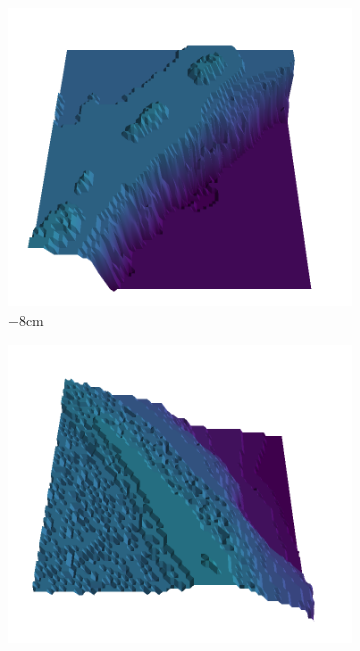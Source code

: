 \documentclass[../document.tex]{subfiles}
\begin{document}
    \begin{figure}[htbp]
        \centering
        \begin{subfigure}[b]{0.19\textwidth}
        \includegraphics[width=\linewidth]{../img/5/quarry/all/worst/-8-patch-3d-majavi-colormap-0.png}
        \caption{$-8$cm}
        \end{subfigure}
        \begin{subfigure}[b]{0.19\textwidth}
        \includegraphics[width=\linewidth]{../img/5/quarry/all/worst/00-patch-3d-majavi-colormap-1.png}

\end{subfigure}
\end{figure}
\end{document}
